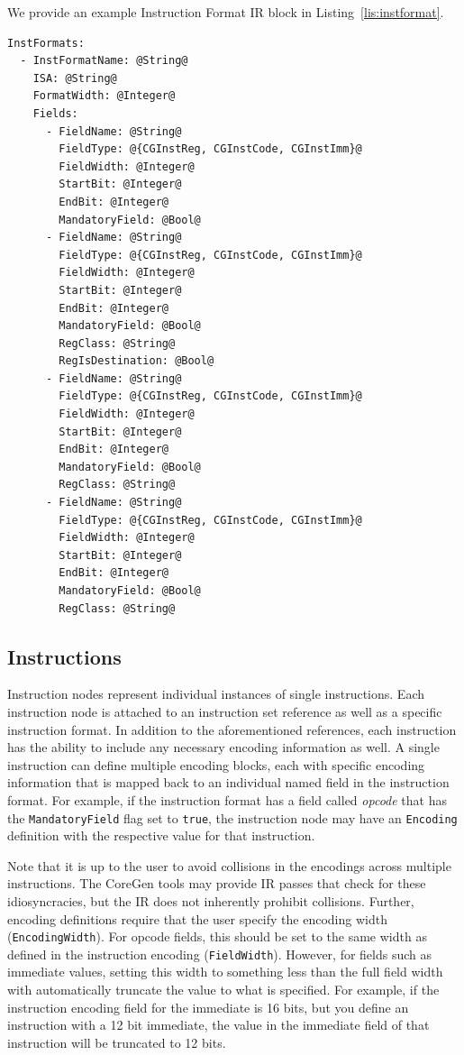 \documentclass{article}
\begin{document}
We provide an example Instruction Format IR block in Listing~\ref{lis:instformat}.  

\vspace{0.125in}
\begin{lstlisting}[frame=single,style=base,caption={Instruction Format Node Definition},captionpos=b,label={lis:instformat}]
InstFormats:
  - InstFormatName: @String@
    ISA: @String@
    FormatWidth: @Integer@
    Fields:
      - FieldName: @String@
        FieldType: @{CGInstReg, CGInstCode, CGInstImm}@
        FieldWidth: @Integer@
        StartBit: @Integer@
        EndBit: @Integer@
        MandatoryField: @Bool@
      - FieldName: @String@
        FieldType: @{CGInstReg, CGInstCode, CGInstImm}@
        FieldWidth: @Integer@
        StartBit: @Integer@
        EndBit: @Integer@
        MandatoryField: @Bool@
        RegClass: @String@
        RegIsDestination: @Bool@
      - FieldName: @String@
        FieldType: @{CGInstReg, CGInstCode, CGInstImm}@
        FieldWidth: @Integer@
        StartBit: @Integer@
        EndBit: @Integer@
        MandatoryField: @Bool@
        RegClass: @String@
      - FieldName: @String@
        FieldType: @{CGInstReg, CGInstCode, CGInstImm}@
        FieldWidth: @Integer@
        StartBit: @Integer@
        EndBit: @Integer@
        MandatoryField: @Bool@
        RegClass: @String@
\end{lstlisting}

\clearpage
\subsection{Instructions}
\label{sec:InstructionNodes}

Instruction nodes represent individual instances of single instructions.  Each instruction 
node is attached to an instruction set reference as well as a specific instruction format.  In addition 
to the aforementioned references, each instruction has the ability to include any necessary encoding 
information as well.  A single instruction can define multiple encoding blocks, each with specific 
encoding information that is mapped back to an individual named field in the instruction format.  For example, 
if the instruction format has a field called \textit{opcode} that has the \texttt{MandatoryField} flag set to \texttt{true}, 
the instruction node may have an \texttt{Encoding} definition with the respective value for that instruction.  

Note that it is up to the user to avoid collisions in the encodings across multiple instructions.  The CoreGen tools 
may provide IR passes that check for these idiosyncracies, but the IR does not inherently prohibit collisions.  Further, 
encoding definitions require that the user specify the encoding width (\texttt{EncodingWidth}).  For opcode fields, this 
should be set to the same width as defined in the instruction encoding (\texttt{FieldWidth}).  However, for fields such 
as immediate values, setting this width to something less than the full field width with automatically truncate the value 
to what is specified.  For example, if the instruction encoding field for the immediate is 16 bits, but you define an instruction 
with a 12 bit immediate, the value in the immediate field of that instruction will be truncated to 12 bits.
\end{document}

